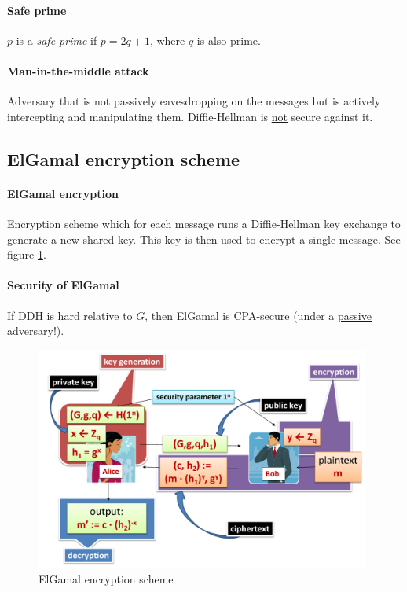 \paragraph{Safe prime} $p$ is a \textit{safe prime} if $p = 2q + 1$, where $q$ is also prime.

\paragraph{Man-in-the-middle attack} Adversary that is not passively eavesdropping on the messages but is actively intercepting and manipulating them. Diffie-Hellman is \underline{not} secure against it.


\subsection{ElGamal encryption scheme}

\paragraph{ElGamal encryption} Encryption scheme which for each message runs a Diffie-Hellman key exchange to generate a new shared key. This key is then used to encrypt a single message. See figure \ref{fig:elgamal}.

\paragraph{Security of ElGamal} If DDH is hard relative to $G$, then ElGamal is CPA-secure (under a \underline{passive} adversary!).

\begin{figure}[h]
    \centering
    \includegraphics[width=11cm]{images/ch5-elgamal.png}
    \caption{ElGamal encryption scheme}
    \label{fig:elgamal}
\end{figure}


